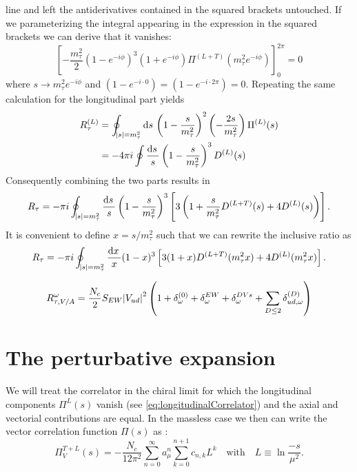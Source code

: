\documentclass[../../index.tex]{subfiles}
\begin{document}
line and left the antiderivatives contained in the squared brackets untouched.
If we parameterizing the integral appearing in the expression in the squared
brackets we can derive that it vanishes:
\begin{equation}
    \left[ -\frac{m_\tau^2}{2} \left( 1 - e^{-i \phi} \right)^3 \left( 1 + e^{-i \phi} \right) \Pi^{(L+T)}(m_\tau^2 e^{-i \phi}) \right]_0^{2\pi} = 0
\end{equation}
where $s \to m_\tau^2 e^{-i \phi}$ and $(1 - e^{-i \cdot 0}) = (1 - e^{-i \cdot 2 \pi})
= 0$.
Repeating the same calculation for the longitudinal part yields
\begin{equation}
  \begin{split}
    R_\tau^{(L)} &= \oint_{\abs{s}=m_\tau^2} \dif s \left( 1 - \frac{s}{m_\tau^2} \right)^2 \left( - \frac{2 s}{m_\tau^2} \right) \Pi^{(L)}(s) \\
    &= - 4 \pi i \oint \frac{\dif s}{s} \left( 1 - \frac{s}{m_\tau^2} \right)^3 D^{(L)}(s)
  \end{split}
\end{equation}
Consequently combining the two parts results in
\begin{equation}
  R_\tau = - \pi i \oint_{\abs{s}=m_\tau^2} \frac{\dif s}{s} \left( 1 - \frac{s}{m_\tau^2} \right)^3 \left[ 3 \left( 1 + \frac{s}{m_\tau^2} D^{(L+T)}(s) + 4 D^{(L)}(s) \right) \right].
\end{equation}
It is convenient to define $x=s/m_\tau^2$ such that we can rewrite the inclusive
ratio as
\begin{equation}
  \label{eq:rTauFinal}
  R_\tau = - \pi i \oint_{\abs{s}=m_\tau^2} \frac{\dif x}{x} (1 - x)^3 \left[ 3 (1 + x) D^{(L+T)}(m_\tau^2 x) + 4 D^{(L)}(m_\tau^2 x)  \right].
\end{equation}

\begin{equation}
  \label{eq:rTauContributions}
  R_{\tau,V/A}^\omega = \frac{N_c}{2}S_{EW} \abs{V_{ud}}^2 \left( 1 + \delta_{\omega}^{(0)} + \delta^{EW}_{\omega} + \delta_{\omega}^{DVs} + \sum_{D \leq 2} \delta^{(D)}_{ud,\omega} \right)
\end{equation}

\section{The perturbative expansion}
We will treat the correlator in the chiral limit for which the longitudinal
components $\Pi^{L}(s)$ vanish (see \cref{eq:longitudinalCorrelator}) and the
axial and vectorial contributions are equal. In the massless case we then
can write the vector correlation function $\Pi(s)$ as \cite{Beneke2008}:
\begin{equation}
  \label{eq:correlatorExpansion}
  \Pi_V^{T+L}(s) = - \frac{N_c}{12 \pi^2} \sum_{n=0}^\infty a_\mu^n \sum_{k=0}^{n+1} c_{n,k} L^{k} \quad \text{with} \quad L \equiv \ln \frac{-s}{\mu^2}.
\end{equation}
\end{document}
